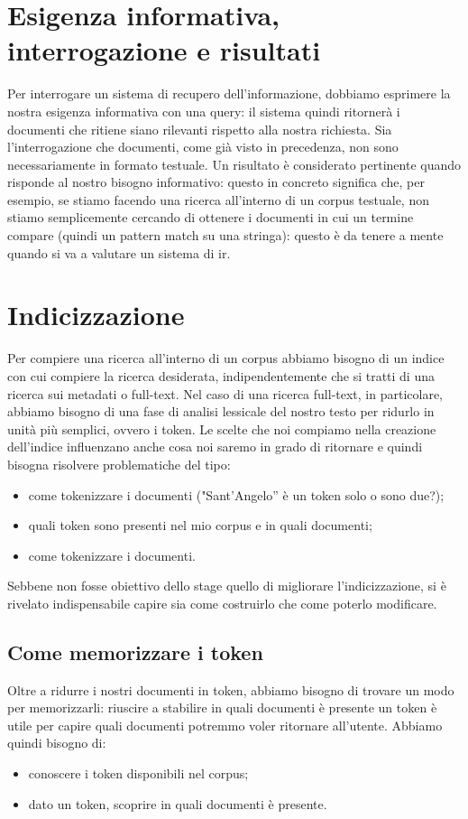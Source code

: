 \section{Esigenza informativa, interrogazione e risultati}
Per interrogare un sistema di recupero dell'informazione, dobbiamo esprimere la nostra esigenza informativa con una query: il sistema quindi ritornerà i documenti che ritiene siano rilevanti rispetto alla nostra richiesta. Sia l'interrogazione che documenti, come già visto in precedenza, non sono necessariamente in formato testuale. Un risultato è considerato pertinente quando risponde al nostro bisogno informativo: questo in concreto significa che, per esempio, se stiamo facendo una ricerca all’interno di un \gls{corpus} testuale, non stiamo semplicemente cercando di ottenere i documenti in cui un termine compare (quindi un pattern match su una stringa): questo è da tenere a mente quando si va a valutare un sistema di \gls{ir}.

\section{Indicizzazione}
\label{sec:indicizzazione}
Per compiere una ricerca all’interno di un \gls{corpus} abbiamo bisogno di un indice con cui compiere la ricerca desiderata, indipendentemente che si tratti di una ricerca sui metadati o full-text. Nel caso di una ricerca full-text, in particolare, abbiamo bisogno di una fase di analisi lessicale del nostro testo per ridurlo in unità più semplici, ovvero i \gls{token}\glsfirstoccur{}. Le scelte che noi compiamo nella creazione dell'indice influenzano anche cosa noi saremo in grado di ritornare e quindi bisogna risolvere problematiche del tipo:

\begin{itemize}
    \item come tokenizzare i documenti ("Sant’Angelo” è un \gls{token} solo o sono due?);
    \item quali \gls{token} sono presenti nel mio \gls{corpus} e in quali documenti;
    \item come tokenizzare i documenti.
\end{itemize}


Sebbene non fosse obiettivo dello stage quello di migliorare l’indicizzazione, si è rivelato indispensabile capire sia come costruirlo che come poterlo modificare.

\subsection{Come memorizzare i token}
Oltre a ridurre i nostri documenti in \gls{token}, abbiamo bisogno di trovare un modo per memorizzarli: riuscire a stabilire in quali documenti è presente un \gls{token} è utile per capire quali documenti potremmo voler ritornare all’utente. Abbiamo quindi bisogno di:
\begin{itemize}
    \item conoscere i \gls{token} disponibili nel \gls{corpus};
    \item dato un \gls{token}, scoprire in quali documenti è presente.
\end{itemize}

